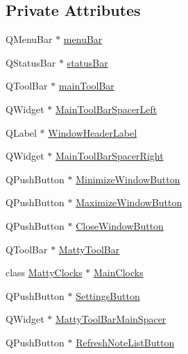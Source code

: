 \subsection*{Private Attributes}
\begin{DoxyCompactItemize}
\item 
Q\+Menu\+Bar $\ast$ \hyperlink{class_matty_notes_main_window_aad3423e267a86fc4e17cf1cc39a84173}{menu\+Bar}
\item 
Q\+Status\+Bar $\ast$ \hyperlink{class_matty_notes_main_window_acccc534f50bac336cd6fabdba5406c12}{status\+Bar}
\item 
Q\+Tool\+Bar $\ast$ \hyperlink{class_matty_notes_main_window_a573c7ad7a77e152e381f377481b15acb}{main\+Tool\+Bar}
\item 
Q\+Widget $\ast$ \hyperlink{class_matty_notes_main_window_a0c0315e670c5b91955fa08ff7e16a631}{Main\+Tool\+Bar\+Spacer\+Left}
\item 
Q\+Label $\ast$ \hyperlink{class_matty_notes_main_window_a615bd7bd2d770a4d0b97f09c71e32333}{Window\+Header\+Label}
\item 
Q\+Widget $\ast$ \hyperlink{class_matty_notes_main_window_a022f28a03e7d9653aca44e9a11e2997b}{Main\+Tool\+Bar\+Spacer\+Right}
\item 
Q\+Push\+Button $\ast$ \hyperlink{class_matty_notes_main_window_aa56b544884c8e5bceccd0442ad5f32f1}{Minimize\+Window\+Button}
\item 
Q\+Push\+Button $\ast$ \hyperlink{class_matty_notes_main_window_a385e70529a6b11059d15d79cdf7d7ef3}{Maximize\+Window\+Button}
\item 
Q\+Push\+Button $\ast$ \hyperlink{class_matty_notes_main_window_ac2eeae021e41b4529f0a0f370c6ea9ac}{Close\+Window\+Button}
\item 
Q\+Tool\+Bar $\ast$ \hyperlink{class_matty_notes_main_window_a36941bdb55f9a9dabb1d8070f332f73d}{Matty\+Tool\+Bar}
\item 
class \hyperlink{class_matty_clocks}{Matty\+Clocks} $\ast$ \hyperlink{class_matty_notes_main_window_afe11d413e344c6d00bdceef2d500e47d}{Main\+Clocks}
\item 
Q\+Push\+Button $\ast$ \hyperlink{class_matty_notes_main_window_ad9cb13412434d6fc084b5ead14b48356}{Settings\+Button}
\item 
Q\+Widget $\ast$ \hyperlink{class_matty_notes_main_window_acd86504db4060e59acb9e3e59b68c84c}{Matty\+Tool\+Bar\+Main\+Spacer}
\item 
Q\+Push\+Button $\ast$ \hyperlink{class_matty_notes_main_window_acbbcc35de95ac20e40222e05d18c4c18}{Refresh\+Note\+List\+Button}

\end{DoxyCompactItemize}
